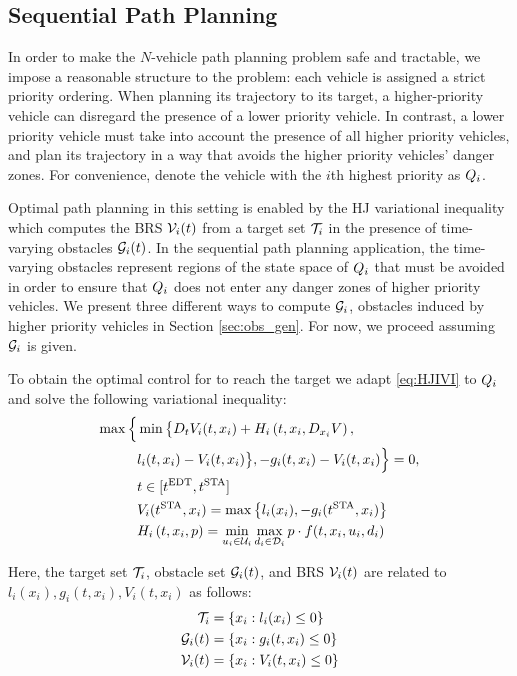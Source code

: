 \subsection{Sequential Path Planning}
In order to make the $N$-vehicle path planning problem safe and tractable, we impose a reasonable structure to the problem: each vehicle is assigned a strict priority ordering. When planning its trajectory to its target, a higher-priority vehicle can disregard the presence of a lower priority vehicle. In contrast, a lower priority vehicle must take into account the presence of all higher priority vehicles, and plan its trajectory in a way that avoids the higher priority vehicles' danger zones. For convenience, denote the vehicle with the $i$th highest priority as $Q_i$.

Optimal path planning in this setting is enabled by the HJ variational inequality which computes the BRS $\mathcal{V}_i(t)$ from a target set $\mathcal{T}_i$ in the presence of time-varying obstacles $\mathcal{G}_i(t)$. In the sequential path planning application, the time-varying obstacles represent regions of the state space of $Q_i$ that must be avoided in order to ensure that $Q_i$ does not enter any danger zones of higher priority vehicles. We present three different ways to compute $\mathcal{G}_i$, obstacles induced by higher priority vehicles in Section \ref{sec:obs_gen}. For now, we proceed assuming $\mathcal{G}_i$ is given.

To obtain the optimal control for to reach the target we adapt \eqref{eq:HJIVI} to $Q_i$ and solve the following variational inequality:
%
\begin{equation}
\label{eq:HJIVI_i}
\begin{aligned}
\max\Big\{&\min\big\{D_t V_i(t, x_i) + H_i\left(t, x_i, D_{x_i} V\right),\\
& l_i(t, x_i) - V_i(t, x_i)\big\}, -g_i(t, x_i) - V_i(t, x_i)\Big\} = 0, \\
& t \in [t^\text{EDT}, t^\text{STA}]\\
&V_i(t^\text{STA}, x_i) = \max\big\{l_i(x_i), -g_i(t^\text{STA}, x_i)\big\} \\
&H_i\left(t, x_i, p\right) = \min_{u_i \in \mathcal{U}_i} \max_{d_i \in \mathcal{D}_i} p \cdot f(t, x_i, u_i, d_i)
\end{aligned}
\end{equation}

Here, the target set $\mathcal{T}_i$, obstacle set $\mathcal{G}_i(t)$, and BRS $\mathcal{V}_i(t)$ are related to $l_i(x_i), g_i(t, x_i), V_i(t, x_i)$ as follows:
%
\begin{equation}
\begin{aligned}
\mathcal{T}_i &= \{x_i: l_i(x_i) \le 0\} \\
\mathcal{G}_i(t) &= \{x_i: g_i(t, x_i) \le 0\} \\
\mathcal{V}_i(t) &= \{x_i: V_i(t, x_i) \le 0\}
\end{aligned}
\end{equation}

